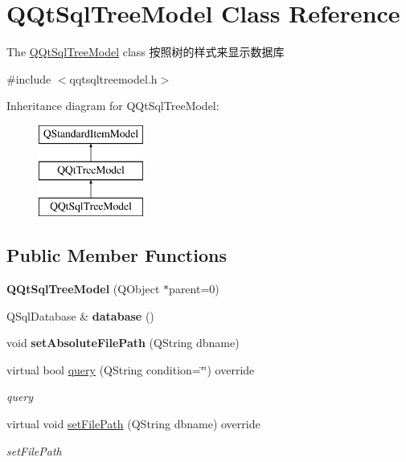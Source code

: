 \hypertarget{class_q_qt_sql_tree_model}{}\section{Q\+Qt\+Sql\+Tree\+Model Class Reference}
\label{class_q_qt_sql_tree_model}


The \mbox{\hyperlink{class_q_qt_sql_tree_model}{Q\+Qt\+Sql\+Tree\+Model}} class 按照树的样式来显示数据库  




{\ttfamily \#include $<$qqtsqltreemodel.\+h$>$}

Inheritance diagram for Q\+Qt\+Sql\+Tree\+Model\+:\begin{figure}[H]
\begin{center}
\leavevmode
\includegraphics[height=3.000000cm]{class_q_qt_sql_tree_model}
\end{center}
\end{figure}
\subsection*{Public Member Functions}
\begin{DoxyCompactItemize}
\item 
\mbox{\label{class_q_qt_sql_tree_model_ae63ebffd13f9121d9a29d6e0cfafc125}} 
{\bfseries Q\+Qt\+Sql\+Tree\+Model} (Q\+Object $\ast$parent=0)
\item 
\mbox{\label{class_q_qt_sql_tree_model_a7d1deeb96fa83028c74e2a0926d9cd74}} 
Q\+Sql\+Database \& {\bfseries database} ()
\item 
\mbox{\label{class_q_qt_sql_tree_model_ade8037b52e99562b0620ad9680686a2c}} 
void {\bfseries set\+Absolute\+File\+Path} (Q\+String dbname)
\item 
virtual bool \mbox{\hyperlink{class_q_qt_sql_tree_model_a786e05d313e70e50d7103c28dd7a2554}{query}} (Q\+String condition=\char`\"{}\char`\"{}) override
\begin{DoxyCompactList}\small\item\em query \end{DoxyCompactList}\item 
virtual void \mbox{\hyperlink{class_q_qt_sql_tree_model_ac1e2c11eda3698560b9e794a8d37c9fc}{set\+File\+Path}} (Q\+String dbname) override
\begin{DoxyCompactList}\small\item\em set\+File\+Path \end{DoxyCompactList}\end{DoxyCompactItemize}
